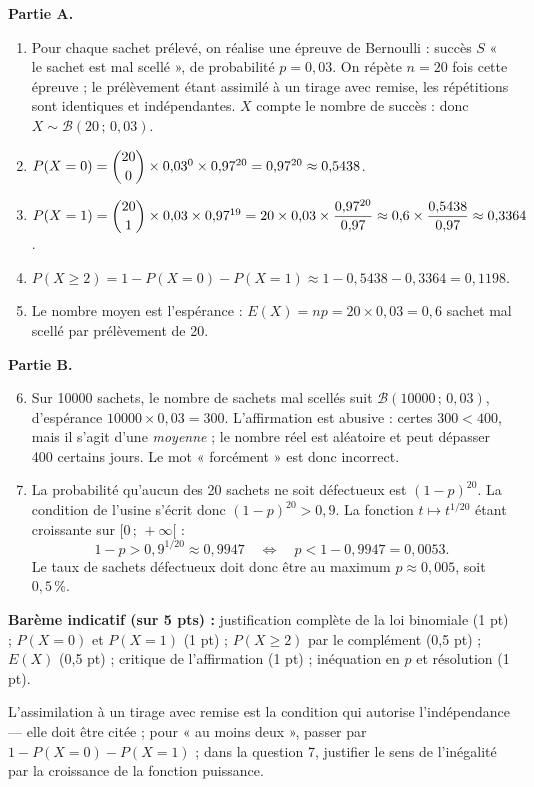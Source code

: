 \documentclass[11pt]{article}
\begin{document}
\begin{corrige}
\textbf{Partie A.}
\begin{enumerate}
\item Pour chaque sachet prélevé, on réalise une épreuve de Bernoulli : succès $S$ « le sachet est mal scellé », de probabilité $p=0{,}03$. On répète $n=20$ fois cette épreuve ; le prélèvement étant assimilé à un tirage avec remise, les répétitions sont identiques et indépendantes. $X$ compte le nombre de succès : donc $X\sim\mathcal{B}(20\,;\,0{,}03)$.
\item $P(X=0)=\dbinom{20}{0}\times 0{,}03^0\times 0{,}97^{20}=0{,}97^{20}\approx 0{,}5438$.
\item $P(X=1)=\dbinom{20}{1}\times 0{,}03\times 0{,}97^{19}=20\times 0{,}03\times \dfrac{0{,}97^{20}}{0{,}97}\approx 0{,}6\times \dfrac{0{,}5438}{0{,}97}\approx 0{,}3364$.
\item $P(X\ge 2)=1-P(X=0)-P(X=1)\approx 1-0{,}5438-0{,}3364=0{,}1198$.
\item Le nombre moyen est l'espérance : $E(X)=np=20\times 0{,}03=0{,}6$ sachet mal scellé par prélèvement de 20.
\end{enumerate}

\textbf{Partie B.}
\begin{enumerate}
\setcounter{enumi}{5}
\item Sur \num{10000} sachets, le nombre de sachets mal scellés suit $\mathcal{B}(10000\,;\,0{,}03)$, d'espérance $10000\times 0{,}03=300$. L'affirmation est abusive : certes $300<400$, mais il s'agit d'une \emph{moyenne} ; le nombre réel est aléatoire et peut dépasser 400 certains jours. Le mot « forcément » est donc incorrect.
\item La probabilité qu'aucun des 20 sachets ne soit défectueux est $(1-p)^{20}$. La condition de l'usine s'écrit donc $(1-p)^{20}>0{,}9$. La fonction $t\mapsto t^{1/20}$ étant croissante sur $[0\,;\,+\infty[$ :
\[1-p>0{,}9^{1/20}\approx 0{,}9947 \quad\Longleftrightarrow\quad p<1-0{,}9947=0{,}0053.\]
Le taux de sachets défectueux doit donc être au maximum $p\approx 0{,}005$, soit $0{,}5\,\%$.
\end{enumerate}
\textbf{Barème indicatif (sur 5 pts) :} justification complète de la loi binomiale (1 pt) ; $P(X=0)$ et $P(X=1)$ (1 pt) ; $P(X\ge 2)$ par le complément (0,5 pt) ; $E(X)$ (0,5 pt) ; critique de l'affirmation (1 pt) ; inéquation en $p$ et résolution (1 pt).

\begin{attention}
L'assimilation à un tirage avec remise est la condition qui autorise l'indépendance — elle doit être citée ; pour « au moins deux », passer par $1-P(X=0)-P(X=1)$ ; dans la question 7, justifier le sens de l'inégalité par la croissance de la fonction puissance.
\end{attention}
\end{corrige}
\end{document}
